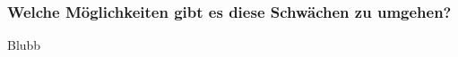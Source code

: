 \subsubsection{Welche Möglichkeiten gibt es diese Schwächen zu umgehen?}\label{diskussion:schwaechen:umgehen}

Blubb
